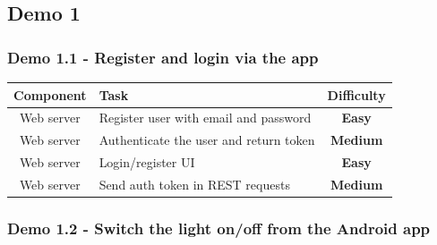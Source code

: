 \documentclass[onecolumn]{IEEEtran}
\newcommand{\easy}{{\color{green} \textbf{Easy}}}
\newcommand{\medium}{{\color{orange} \textbf{Medium}}}
\begin{document}
\subsection{Demo 1}

\subsubsection{Demo 1.1 - Register and login via the app}

\begin{center}
    \begin{tabularx}{0.8\linewidth}{|c|L|c|}
        \hline
        \textbf{Component} & \textbf{Task} & \textbf{Difficulty} \\
        \hline
        Web server & Register user with email and password & \easy \\
        \hline
        Web server & Authenticate the user and return token & \medium \\
        \hline
        Web server & Login/register UI & \easy \\
        \hline
        Web server & Send auth token in REST requests & \medium \\
        \hline
    \end{tabularx}
\end{center}

\subsubsection{Demo 1.2 - Switch the light on/off from the Android app}
\end{document}
